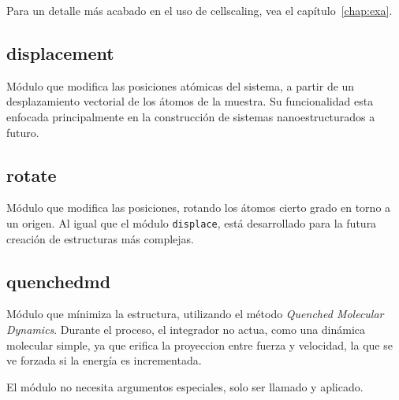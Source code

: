 Para un detalle m\'as acabado en el uso de cellscaling, vea el cap\'itulo~\ref{chap:exa}.

\subsection{displacement}
M\'odulo que modifica las posiciones at\'omicas del sistema, a partir de un desplazamiento vectorial de los \'atomos de la muestra. Su funcionalidad esta enfocada principalmente en la construcci\'on de sistemas nanoestructurados a futuro.


\subsection{rotate}
M\'odulo que modifica las posiciones, rotando los \'atomos cierto grado en torno a un origen. Al igual que el m\'odulo \verb|displace|, est\'a desarrollado para la futura creaci\'on de estructuras m\'as complejas.


\subsection{quenchedmd}
M\'odulo que m\'inimiza la estructura, utilizando el m\'etodo \textit{Quenched Molecular Dynamics}. Durante el proceso, el integrador no actua, como una din\'amica molecular simple, ya que erifica la proyeccion entre fuerza y velocidad, la que se ve forzada si la energ\'ia es incrementada.

El m\'odulo no necesita argumentos especiales, solo ser llamado y aplicado.


